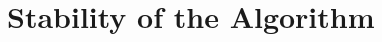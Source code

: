 \documentclass[11pt, a4paper]{article}
\newtheorem{theorem}{Theorem}
\begin{document}

\section{Stability of the Algorithm}

\end{document}
